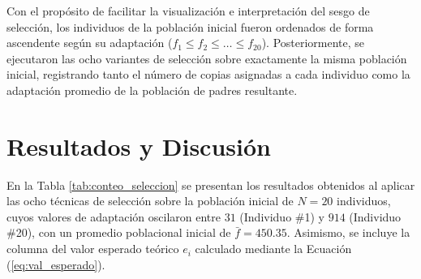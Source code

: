 \documentclass[11pt,letterpaper]{article}
\begin{document}
Con el propósito de facilitar la visualización e interpretación del sesgo de selección, los individuos de la población inicial fueron ordenados de forma ascendente según su adaptación ($f_1 \le f_2 \le \dots \le f_{20}$). Posteriormente, se ejecutaron las ocho variantes de selección sobre exactamente la misma población inicial, registrando tanto el número de copias asignadas a cada individuo como la adaptación promedio de la población de padres resultante.

\section{Resultados y Discusión}
En la Tabla \ref{tab:conteo_seleccion} se presentan los resultados obtenidos al aplicar las ocho técnicas de selección sobre la población inicial de $N = 20$ individuos, cuyos valores de adaptación oscilaron entre $31$ (Individuo \#1) y $914$ (Individuo \#20), con un promedio poblacional inicial de $\bar{f} = 450.35$. Asimismo, se incluye la columna del valor esperado teórico $e_i$ calculado mediante la Ecuación (\ref{eq:val_esperado}).
\end{document}
